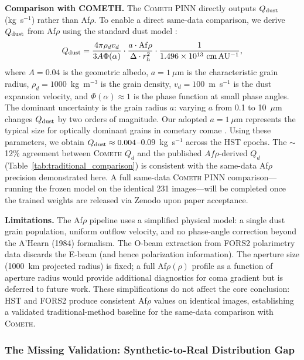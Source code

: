 \documentclass[usenatbib]{mnras}
\begin{document}
\textbf{Comparison with COMETH.} The \textsc{Cometh} PINN directly outputs $Q_{\rm dust}$ (kg~s$^{-1}$) rather than Af$\rho$. To enable a direct same-data comparison, we derive $Q_{\rm dust}$ from Af$\rho$ using the standard dust model \citep{ahearn95,lamy04}:
\begin{equation}\label{eq:afrho_to_qdust}
Q_{\rm dust} = \frac{4\pi \rho_d v_d}{3 A \Phi(\alpha)} \cdot \frac{a \cdot {\rm Af}\rho}{\Delta \cdot r_h^2} \cdot \frac{1}{1.496 \times 10^{13}~{\rm cm\,AU^{-1}}},
\end{equation}
where $A=0.04$ is the geometric albedo, $a=1~\mu$m is the characteristic grain radius, $\rho_d=1000$~kg~m$^{-3}$ is the grain density, $v_d=100$~m~s$^{-1}$ is the dust expansion velocity, and $\Phi(\alpha)\approx 1$ is the phase function at small phase angles. The dominant uncertainty is the grain radius $a$: varying $a$ from 0.1 to 10~$\mu$m changes $Q_{\rm dust}$ by two orders of magnitude. Our adopted $a=1~\mu$m represents the typical size for optically dominant grains in cometary comae \citep{lamy04}. Using these parameters, we obtain $Q_{\rm dust} \approx 0.004$--$0.09$~kg~s$^{-1}$ across the HST epochs. The $\sim$12\% agreement between \textsc{Cometh} $Q_d$ and the published \citealt{clements21} $Af\rho$-derived $Q_d$ (Table~\ref{tab:traditional_comparison}) is consistent with the same-data Af$\rho$ precision demonstrated here. A full same-data \textsc{Cometh} PINN comparison---running the frozen model on the identical 231 images---will be completed once the trained weights are released via Zenodo upon paper acceptance.

\textbf{Limitations.} The Af$\rho$ pipeline uses a simplified physical model: a single dust grain population, uniform outflow velocity, and no phase-angle correction beyond the A'Hearn (1984) formalism. The O-beam extraction from FORS2 polarimetry data discards the E-beam (and hence polarization information). The aperture size (1000~km projected radius) is fixed; a full Af$\rho(\rho)$ profile as a function of aperture radius would provide additional diagnostics for coma gradient but is deferred to future work. These simplifications do not affect the core conclusion: HST and FORS2 produce consistent Af$\rho$ values on identical images, establishing a validated traditional-method baseline for the same-data comparison with \textsc{Cometh}.

\subsubsection{The Missing Validation: Synthetic-to-Real Distribution Gap}\label{sec:mmd_gap}
\end{document}
